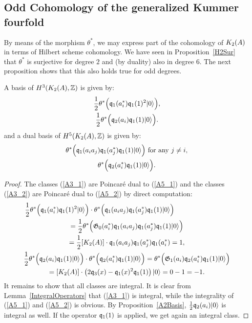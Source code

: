 \subsection{Odd Cohomology of the generalized Kummer fourfold}\label{oddcohoK2}

By means of the morphism $\theta^*$, we may express part of the cohomology of $\kum{A}{2}$ in terms of Hilbert scheme cohomology. We have seen in Proposition~\ref{H2Sur} that $\theta^*$ is surjective for degree $2$ and (by duality) also in degree $6$. 
The next proposition shows that this also holds true for odd degrees.
\begin{proposition}\label{oddcohomology}
A basis of $H^3(\X,\Z)$ is given by:
\begin{gather}
\label{A3_1}
\frac{1}{2}\theta^*\Big( \q_1(a^*_i)\q_1(1)^2\vac \Big), \\
\label{A3_2}
\frac{1}{2}\theta^*\Big(\q_2(a_i)\q_1(1)\vac\Big).
\end{gather}
and a dual basis of $H^5(\X,\Z)$ is given by:
\begin{gather}
\label{A5_1}
 \theta^*\Big( \q_1(a_ia_j)\q_1(a_j^*)\q_1(1) \vac \Big) \ \text{for any } j\neq i, \\
\label{A5_2}
\theta^*\Big( \q_2(a^*_i)\q_1(1)\vac \Big).
\end{gather}
\end{proposition}
\begin{proof}
The classes (\ref{A3_1}) are Poincar\'e dual to (\ref{A5_1}) and the classes (\ref{A3_2}) are Poincar\'e dual to (\ref{A5_2}) by direct computation:
\begin{gather*}
\frac{1}{2}\theta^*\Big( \q_1(a^*_i)\q_1(1)^2\vac \Big)\cdot \theta^*\Big( \q_1(a_ia_j)\q_1(a_j^*)\q_1(1) \vac \Big) \hspace{80pt}
\\ = \frac{1}{2} \theta^*\Big(  \G_0(a^*_i) \q_1(a_ia_j)\q_1(a_j^*)\q_1(1) \vac \Big)\\
 =  \frac{1}{2}[\X]\cdot \q_1(a_ia_j)\q_1(a_j^*)\q_1(a_i^*) = 1, \\
 \frac{1}{2}\theta^*\Big(\q_2(a_i)\q_1(1)\vac\Big)\cdot \theta^*\Big( \q_2(a^*_i)\q_1(1)\vac \Big) =\theta^*\Big( \G_1(a_i)\q_2(a^*_i)\q_1(1)\vac  \Big) \\
 = [\X]\cdot \left( 2\q_3(x) - \q_1(x)^2\q_1(1) \right) \vac = 0-1=-1.
\end{gather*}
It remains to show that all classes are integral.
It is clear from Lemma~\ref{IntegralOperators} that (\ref{A3_1}) is integral, while the integrality of (\ref{A5_1}) and (\ref{A5_2}) is obvious. By Proposition~\ref{A2Basis}, $\frac{1}{2}\q_2(a_i)\vac$ is integral as well. If the operator $ \q_1(1)$ is applied, we get again an integral class.
\end{proof}
